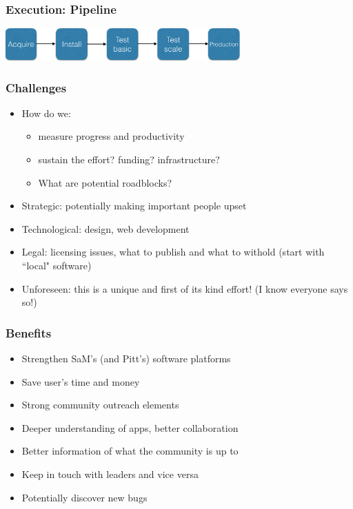 \documentclass[hyperref={pdfpagelabels=false},12pt]{beamer}
\begin{document}
\begin{frame}
\frametitle{Execution: Pipeline}
\includegraphics[width=9cm]{workflow}
\end{frame}

\begin{frame}
\frametitle{Challenges}
\begin{itemize}
\itemsep1em
\item
 How do we:
\begin{itemize}
 \item
 measure progress and productivity
 \item
 sustain the effort? funding? infrastructure?
 \item
 What are potential roadblocks?
\end{itemize}
\item 
Strategic: potentially making important people upset
\item
Technological: design, web development
\item
Legal: licensing issues, what to publish and what to withold (start with ``local" software)
\item
Unforeseen: this is a unique and first of its kind effort! (I know everyone says so!)
\end{itemize}
\end{frame}

\begin{frame}
\frametitle{Benefits}
\begin{itemize}
\itemsep1em
\item Strengthen SaM's (and Pitt's) software platforms
\item
Save user's time and money
\item
Strong community outreach elements
\item
Deeper understanding of apps, better collaboration
\item 
Better information of what the community is up to
\item
Keep in touch with leaders and vice versa
\item
Potentially discover new bugs
\end{itemize}
\end{frame}
\end{document}
